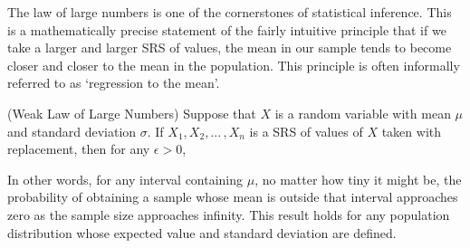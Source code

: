 The law of large numbers is one of the cornerstones of statistical inference. This is a mathematically precise statement of the fairly intuitive principle that if we take a larger and larger SRS of values, the mean in our sample tends to become closer and closer to the mean in the population. This principle is often informally referred to as `regression to the mean'.

\begin{thm} (Weak Law of Large Numbers) Suppose that $X$ is a random variable with mean $\mu$ and standard deviation $\sigma$. If $X_1, X_2, ... \, , X_n$ is a SRS of values of $X$ taken with replacement, then for any $\epsilon > 0$,
\end{thm}
\par
In other words, for any interval containing $\mu$, no matter how tiny it might be, the probability of obtaining a sample whose mean is outside that interval approaches zero as the sample size approaches infinity. This result holds for any population distribution whose expected value and standard deviation are defined.
\par
\vspace{1em}
